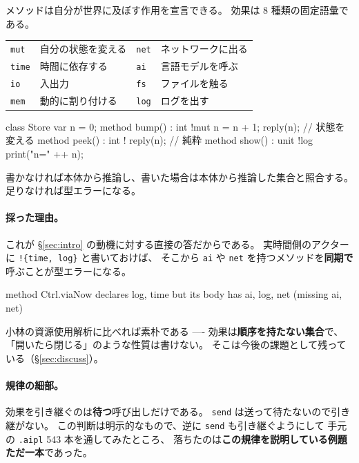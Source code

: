 \documentclass[11pt,a4paper]{ltjsarticle}
\theoremstyle{definition}
\theoremstyle{remark}
\begin{document}
メソッドは自分が世界に及ぼす作用を宣言できる。
効果は 8 種類の固定語彙である。

\begin{center}
\begin{tabular}{ll@{\qquad}ll}
\toprule
\texttt{mut}  & 自分の状態を変える    & \texttt{net} & ネットワークに出る \\
\texttt{time} & 時間に依存する        & \texttt{ai}  & 言語モデルを呼ぶ \\
\texttt{io}   & 入出力                & \texttt{fs}  & ファイルを触る \\
\texttt{mem}  & 動的に割り付ける      & \texttt{log} & ログを出す \\
\bottomrule
\end{tabular}
\end{center}

\begin{aipl}
class Store {
  var n = 0;
  method bump()  : int !{mut}  { n = n + 1; reply(n); }   // 状態を変える
  method peek()  : int !{}     { reply(n); }              // 純粋
  method show()  : unit !{log} { print("n=" ++ n); }
}
\end{aipl}

書かなければ本体から推論し、書いた場合は本体から推論した集合と照合する。
足りなければ型エラーになる。

\paragraph{採った理由。}
これが \S\ref{sec:intro} の動機に対する直接の答だからである。
実時間側のアクターに \texttt{!\{time, log\}} と書いておけば、
そこから \texttt{ai} や \texttt{net} を持つメソッドを\textbf{同期で}呼ぶことが型エラーになる。

\begin{term}
 method Ctrl.viaNow declares {log, time}
             but its body has {ai, log, net} (missing {ai, net})
\end{term}

小林の資源使用解析に比べれば素朴である ---- 効果は\textbf{順序を持たない集合}で、
「開いたら閉じる」のような性質は書けない。
そこは今後の課題として残っている（\S\ref{sec:discuss}）。

\paragraph{規律の細部。}
効果を引き継ぐのは\textbf{待つ}呼び出しだけである。
\texttt{send} は送って待たないので引き継がない。
この判断は明示的なもので、逆に \texttt{send} も引き継ぐようにして
手元の \texttt{.aipl} 543 本を通してみたところ、
落ちたのは\textbf{この規律を説明している例題ただ一本}であった。
\end{document}
